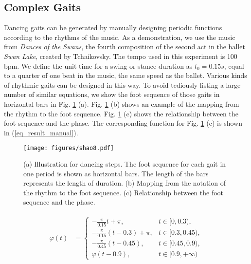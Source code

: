 \documentclass[letterpaper, 10 pt, journal, twoside]{IEEEtran} %
\begin{document}
\subsection{Complex Gaits}
Dancing gaits can be generated by manually designing periodic functions according to the rhythms of the music. As a demonstration, we use the music from \textit{Dances of the Swans}, the fourth composition of the second act in the ballet \textit{Swan Lake}, created by Tchaikovsky. The tempo used in this experiment is 100 bpm. We define the unit time for a swing or stance duration as $t_0=0.15s$, equal to a quarter of one beat in the music, the same speed as the ballet. Various kinds of rhythmic gaits can be designed in this way. To avoid tediously listing a large number of similar equations, we show the foot sequence of those gaits in horizontal bars in Fig. \ref{result_4} (a). Fig. \ref{result_4} (b) shows an example of the mapping from the rhythm to the foot sequence. Fig. \ref{result_4} (c) shows the relationship between the foot sequence and the phase. The corresponding function for Fig. \ref{result_4} (c) is shown in (\ref{eq_result_manual}).
\begin{figure}[!t]
	\centering
	\texttt{[image: figures/shao8.pdf]}
	\caption{(a) Illustration for dancing steps. The foot sequence for each gait in one period is shown as horizontal bars. The length of the bars represents the length of duration. (b) Mapping from the notation of the rhythm to the foot sequence. (c) Relationship between the foot sequence and the phase.}
	\label{result_4}
\end{figure}
\begin{eqnarray}
	\label{eq_result_manual}
	\begin{aligned}
		\varphi\left(t\right)&=
		\begin{cases}
			-\frac{\pi}{0.15} t + \pi, &t\in[0, 0.3),\\
			-\frac{\pi}{0.15} (t-0.3) + \pi, &t\in[0.3, 0.45), \\
			-\frac{\pi}{0.45} (t-0.45), &t\in[0.45, 0.9), \\
			\varphi\left(t-0.9\right), &t\in[0.9, +\infty)
		\end{cases} \\
	\end{aligned}
\end{eqnarray}
\end{document}
